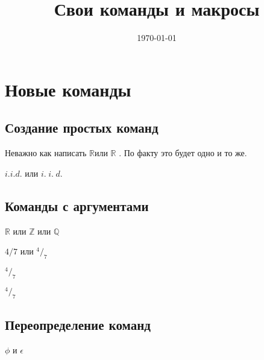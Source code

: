 \documentclass[12pt, a4paper]{article}
\title{Свои команды и макросы}
\date{\today}
\theoremstyle{plain}              %
\theoremstyle{definition}         %
\begin{document}
\maketitle


\section{Новые команды}
\subsection{Создание простых команд}


\def \a{\alpha}
\def \R{\ensuremath{\mathbb{R}}}


\newcommand{\RR}{\ensuremath{\mathbb{R } } }

Неважно как написать \R или \RR. По факту это будет одно и то же.


\newcommand{\iid}{i.\hspace{3pt}i.\hspace{3pt}d.}

$i.i.d.$ или $\iid$

\subsection{Команды с аргументами}

\newcommand{\bb}[1]{\ensuremath{\mathbb{#1}} }

\bb{R} или \bb{Z} или \bb{Q}


$4/7$ или $^4/_7$

\newcommand{\fr}[2]{\ensuremath{^#1/_#2}}

$\fr{4}{7}$

\fr{4}{7}


\subsection{Переопределение команд}

$ \phi $ и $ \epsilon $

\renewcommand{\phi}{\varphi}
\renewcommand{\epsilon}{\varepsilon}
\end{document}
